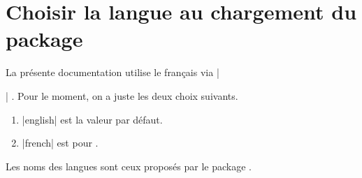 \documentclass[10pt, a4paper]{article}
\begin{document}
\section{Choisir la langue au chargement du package}

La présente documentation utilise le français via \tdocinlatex|\usepackage[lang = french]{tdoc}| .
Pour le moment, on a juste les deux choix suivants.

\begin{enumerate}
    \item \tdocinlatex|english| est la valeur par défaut.

    \item \tdocinlatex|french| est pour .
\end{enumerate}


\begin{tdocnote}
	Les noms des langues sont ceux proposés par le package .
\end{tdocnote}
\end{document}
